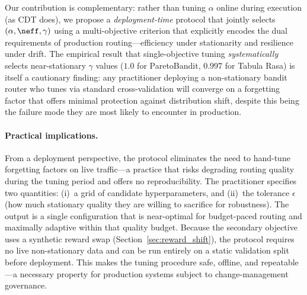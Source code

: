 Our contribution is complementary: rather than tuning $\alpha$
online during execution (as CDT does), we propose a
\emph{deployment-time} protocol that jointly selects
$(\alpha, \neff, \gamma)$ using a multi-objective criterion
that explicitly encodes the dual requirements of
production routing---efficiency under stationarity and resilience
under drift.
The empirical result that single-objective tuning
\emph{systematically} selects near-stationary $\gamma$ values
($1.0$ for ParetoBandit, $0.997$ for Tabula Rasa) is itself a
cautionary finding: any practitioner deploying a non-stationary
bandit router who tunes via standard cross-validation will
converge on a forgetting factor that offers minimal protection
against distribution shift, despite this being the failure mode
they are most likely to encounter in production.

\paragraph{Practical implications.}
From a deployment perspective, the protocol eliminates the need to
hand-tune forgetting factors on live traffic---a practice that risks
degrading routing quality during the tuning period and offers no
reproducibility.
The practitioner specifies two quantities: (i)~a grid of candidate
hyperparameters, and (ii)~the tolerance $\epsilon$ (how much
stationary quality they are willing to sacrifice for robustness).
The output is a single configuration that is
near-optimal for budget-paced routing and maximally adaptive within
that quality budget.
Because the secondary objective uses a synthetic reward swap
(Section~\ref{sec:reward_shift}), the protocol requires no live
non-stationary data and can be run entirely on a static validation
split before deployment.
This makes the tuning procedure safe, offline, and repeatable---a
necessary property for production systems subject to change-management
governance.
